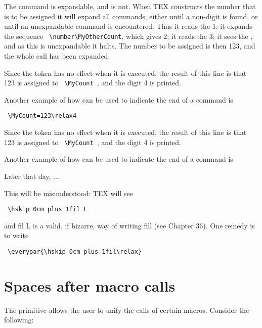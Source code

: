 \CMDI{\number}

The command \cmd{\number} is expandable, and \cmd{\relax} is not. When TEX constructs the number that is
to be assigned it will expand all commands, either until a non-digit is found, or until an unexpandable
command is encountered. Thus it reads the 1; it expands the sequence \verb+ \number\MyOtherCount+,
which gives 2; it reads the 3; it sees the \cmd{\relax}, and as this is unexpandable it halts. The number
to be assigned is then 123, and the whole call has been expanded.


\noindent Since the \cmd{\relax} token has no effect when it is executed, the result of this line is that 123 is
assigned to \verb+ \MyCount +, and the digit 4 is printed.



Another example of how \cmd{\relax} can be used to indicate the end of a command is

\verb+ \MyCount=123\relax4+

\begin{codeexample}[]
\newcount\MyCount
{}\par
\the\MyCount
\end{codeexample}

\noindent Since the  token has no effect when it is executed, the result of this line is that 123 is
assigned to \verb+ \MyCount +, and the digit 4 is printed.

Another example of how  can be used to indicate the end of a command is


\begin{teX}
\indent Later that day, ...
\end{teX}

\noindent This will be misunderstood: TEX will see

\verb+ \hskip 0cm plus 1fil L+

\noindent and fil L is a valid, if bizarre, way of writing fill (see Chapter 36). One remedy is to write

\verb+ \everypar{\hskip 0cm plus 1fil\relax}+

\section{Spaces after macro calls}

\CMDI{\ignorespaces}
The primitive \cmd{\ignorespaces} allows the user to unify the calls of certain macros. Consider the following:

